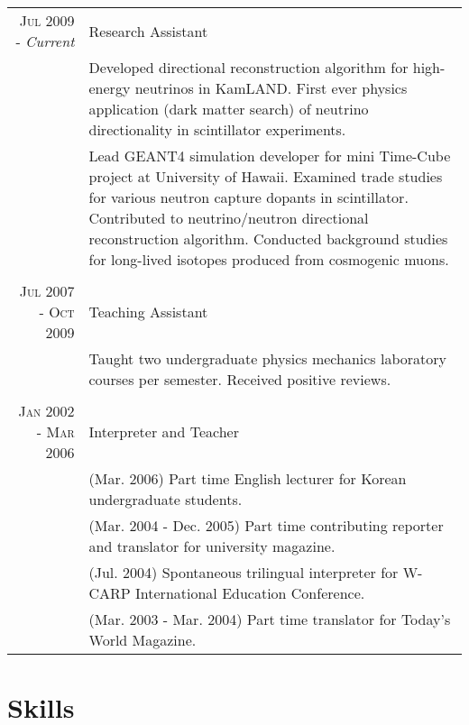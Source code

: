 \documentclass[a4paper,10pt]{article} %
\begin{document}
\begin{tabular}{r|p{11cm}}
\textsc{Jul 2009 - }\textit{Current} & Research Assistant\\
& \footnotesize{
	Developed directional reconstruction algorithm for high-energy
	neutrinos in KamLAND.
	First ever physics application (dark matter search) of neutrino
	directionality in scintillator experiments.
}\\
& \footnotesize{
	Lead GEANT4 simulation developer for mini Time-Cube project at
	University of Hawaii.
	Examined trade studies for various neutron capture dopants in
	scintillator.
	Contributed to neutrino/neutron directional reconstruction algorithm.
	Conducted background studies for long-lived isotopes produced from
	cosmogenic muons.
}\\
\multicolumn{2}{c}{} \\


\textsc{Jul 2007 - Oct 2009} & Teaching Assistant\\
& \footnotesize{
	Taught two undergraduate physics mechanics laboratory courses per semester.
	Received positive reviews.
}\\
\multicolumn{2}{c}{} \\


\textsc{Jan 2002 - Mar 2006} & Interpreter and Teacher\\
& \footnotesize{(Mar. 2006) Part time English lecturer for Korean undergraduate
students.}\\
& \footnotesize{(Mar. 2004 - Dec. 2005) Part time contributing reporter and
translator for university magazine.}\\
& \footnotesize{(Jul. 2004) Spontaneous trilingual interpreter for W-CARP
International Education Conference.}\\
& \footnotesize{(Mar. 2003 - Mar. 2004) Part time translator for Today's World
Magazine.}\\
\end{tabular}


\section{Skills}
\end{document}

